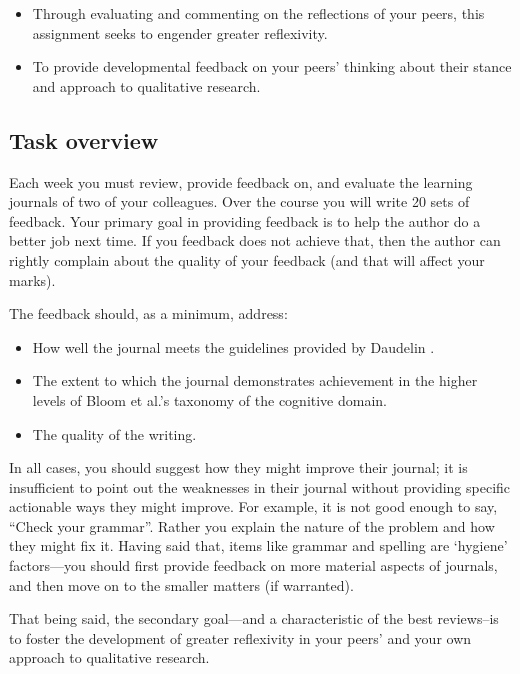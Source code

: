 \documentclass[]{book}
\providecommand{\tightlist}{%
  \setlength{\itemsep}{0pt}\setlength{\parskip}{0pt}}
\theoremstyle{definition}
\theoremstyle{definition}
\theoremstyle{definition}
\theoremstyle{remark}
\begin{document}
\begin{itemize}
\item
  Through evaluating and commenting on the reflections of your peers,
  this assignment seeks to engender greater reflexivity.
\item
  To provide developmental feedback on your peers' thinking about their
  stance and approach to qualitative research.
\end{itemize}

\hypertarget{task-overview-1}{%
\subsection*{Task overview}\label{task-overview-1}}

Each week you must review, provide feedback on, and evaluate the
learning journals of two of your colleagues. Over the course you will
write 20 sets of feedback. Your primary goal in providing feedback is to
help the author do a better job next time. If you feedback does not
achieve that, then the author can rightly complain about the quality of
your feedback (and that will affect your marks).

The feedback should, as a minimum, address:

\begin{itemize}
\tightlist
\item
  How well the journal meets the guidelines provided by Daudelin
  \autocite*{daudelin_1996_learningexperiencereflection}.
\item
  The extent to which the journal demonstrates achievement in the higher
  levels of Bloom et al.'s
  \autocite*{bloom_1956_taxonomyeducationalobjectives} taxonomy of the
  cognitive domain.
\item
  The quality of the writing.
\end{itemize}

In all cases, you should suggest how they might improve their journal;
it is insufficient to point out the weaknesses in their journal without
providing specific actionable ways they might improve. For example, it
is not good enough to say, ``Check your grammar''. Rather you explain
the nature of the problem and how they might fix it. Having said that,
items like grammar and spelling are `hygiene' factors---you should first
provide feedback on more material aspects of journals, and then move on
to the smaller matters (if warranted).

That being said, the secondary goal---and a characteristic of the best
reviews--is to foster the development of greater reflexivity in your
peers' and your own approach to qualitative research.
\end{document}
